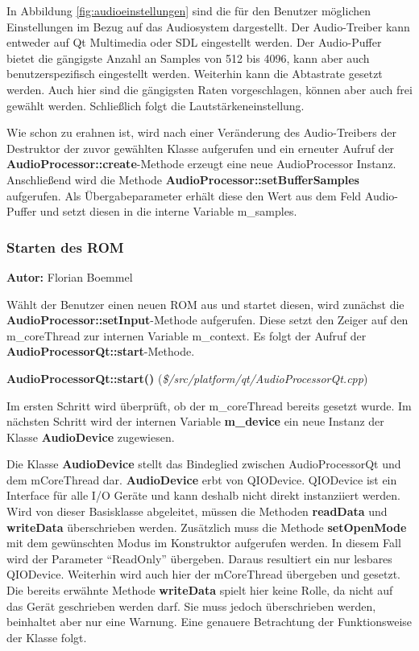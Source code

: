 \documentclass[11pt,a4paper]{scrartcl}
\newcommand{\AutorFlorian} {
    \vspace{-4mm}
    \large \textbf{Autor:} Florian Boemmel \normalsize
    \vspace{2mm}
}
\newcommand{\paratitlecode}[2] {
    \vspace{5mm}
    \large \textbf{#1} \normalsize(\textit{\${#2}})
    \vspace{2mm}\newline
}
\begin{document}
In Abbildung \ref{fig:audioeinstellungen} sind die f\"ur den Benutzer m\"oglichen Einstellungen im Bezug auf das Audiosystem dargestellt. Der Audio-Treiber kann entweder auf Qt Multimedia oder SDL eingestellt werden. Der Audio-Puffer bietet die g\"angigste Anzahl an Samples von 512 bis 4096, kann aber auch benutzerspezifisch eingestellt werden. Weiterhin kann die Abtastrate gesetzt werden. Auch hier sind die g\"angigsten Raten vorgeschlagen, k\"onnen aber auch frei gew\"ahlt werden. Schlie{\ss}lich folgt die Lautst\"arkeneinstellung.

Wie schon zu erahnen ist, wird nach einer Ver\"anderung des Audio-Treibers der Destruktor der zuvor gew\"ahlten Klasse aufgerufen und ein erneuter Aufruf der \textbf{AudioProcessor::create}-Methode erzeugt eine neue AudioProcessor Instanz.
Anschlie{\ss}end wird die Methode \textbf{AudioProcessor::setBufferSamples} aufgerufen. Als \"Ubergabeparameter erh\"alt diese den Wert aus dem Feld Audio-Puffer und setzt diesen in die interne Variable m\_samples.

\newpage
\subsubsection{Starten des ROM}
\AutorFlorian

W\"ahlt der Benutzer einen neuen ROM aus und startet diesen, wird zun\"achst die \textbf{AudioProcessor::setInput}-Methode aufgerufen. Diese setzt den Zeiger auf den m\_coreThread zur internen Variable m\_context. Es folgt der Aufruf der
\textbf{AudioProcessorQt::start}-Methode.

\paratitlecode{AudioProcessorQt::start()}{/src/platform/qt/AudioProcessorQt.cpp}
Im ersten Schritt wird \"uberpr\"uft, ob der m\_coreThread bereits gesetzt wurde. Im n\"achsten Schritt wird der internen Variable \textbf{m\_device} ein neue Instanz der Klasse \textbf{AudioDevice} zugewiesen.

Die Klasse \textbf{AudioDevice} stellt das Bindeglied zwischen AudioProcessorQt und dem mCoreThread dar. \textbf{AudioDevice} erbt von QIODevice. QIODevice ist ein Interface f\"ur alle I/O Ger\"ate und kann deshalb nicht direkt instanziiert werden.
Wird von dieser Basisklasse abgeleitet, m\"ussen die Methoden \textbf{readData} und \textbf{writeData} \"uberschrieben werden. Zus\"atzlich muss die Methode \textbf{setOpenMode} mit dem gew\"unschten Modus im Konstruktor aufgerufen werden. In diesem Fall wird der Parameter \enquote{ReadOnly} \"ubergeben. Daraus resultiert ein nur lesbares QIODevice. Weiterhin wird auch hier der mCoreThread \"ubergeben und gesetzt. Die bereits erw\"ahnte Methode \textbf{writeData} spielt hier keine Rolle, da nicht auf das Ger\"at geschrieben werden darf. Sie muss jedoch \"uberschrieben werden, beinhaltet aber nur eine Warnung. Eine genauere Betrachtung der Funktionsweise der Klasse folgt.
\end{document}

